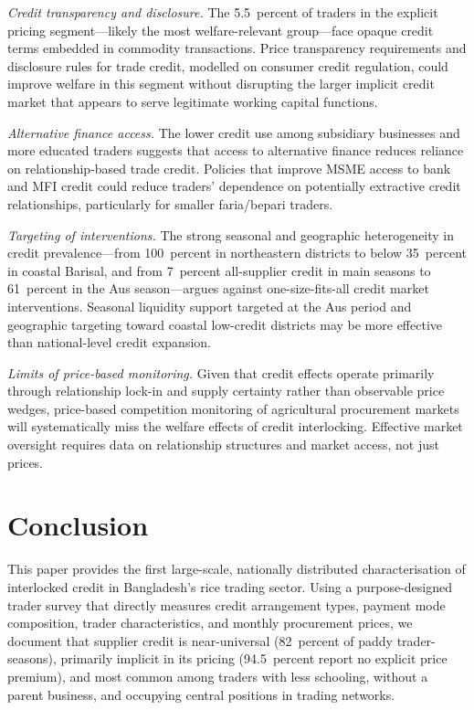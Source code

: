 \documentclass[authoryear,preprint,review,12pt]{elsarticle}
\begin{document}
\textit{Credit transparency and disclosure.} The 5.5~percent of traders
in the explicit pricing segment---likely the most welfare-relevant group---face
opaque credit terms embedded in commodity transactions. Price transparency
requirements and disclosure rules for trade credit, modelled on consumer
credit regulation, could improve welfare in this segment without disrupting
the larger implicit credit market that appears to serve legitimate working
capital functions.

\textit{Alternative finance access.} The lower credit use among subsidiary
businesses and more educated traders suggests that access to alternative
finance reduces reliance on relationship-based trade credit. Policies that
improve MSME access to bank and MFI credit could reduce traders' dependence
on potentially extractive credit relationships, particularly for smaller
faria/bepari traders.

\textit{Targeting of interventions.} The strong seasonal and geographic
heterogeneity in credit prevalence---from 100~percent in northeastern
districts to below 35~percent in coastal Barisal, and from 7~percent
all-supplier credit in main seasons to 61~percent in the Aus season---argues
against one-size-fits-all credit market interventions. Seasonal liquidity
support targeted at the Aus period and geographic targeting toward coastal
low-credit districts may be more effective than national-level credit
expansion.

\textit{Limits of price-based monitoring.} Given that credit effects operate
primarily through relationship lock-in and supply certainty rather than
observable price wedges, price-based competition monitoring of agricultural
procurement markets will systematically miss the welfare effects of credit
interlocking. Effective market oversight requires data on relationship
structures and market access, not just prices.

\section{Conclusion}
\label{sec:conclusion}

This paper provides the first large-scale, nationally distributed
characterisation of interlocked credit in Bangladesh's rice trading sector. Using a purpose-designed
trader survey that directly measures credit arrangement types, payment mode
composition, trader characteristics, and monthly procurement prices, we document
that supplier credit is near-universal (82~percent of paddy trader-seasons),
primarily implicit in its pricing (94.5~percent report no explicit price premium),
and most common among traders with less schooling, without a parent business,
and occupying central positions in trading networks.
\end{document}
